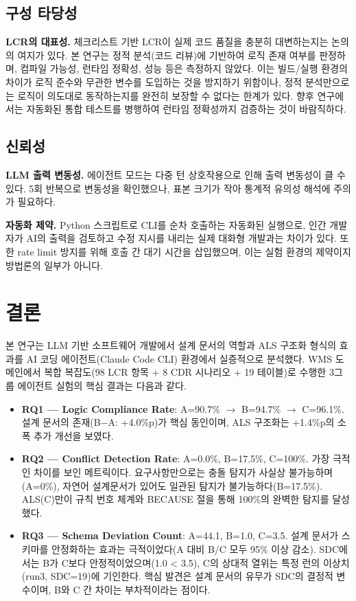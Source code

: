 \documentclass[conference]{IEEEtran}
\begin{document}
\subsection{구성 타당성}

\textbf{LCR의 대표성.} 체크리스트 기반 LCR이 실제 코드 품질을 충분히 대변하는지는 논의의 여지가 있다. 본 연구는 정적 분석(코드 리뷰)에 기반하여 로직 존재 여부를 판정하며, 컴파일 가능성, 런타임 정확성, 성능 등은 측정하지 않았다. 이는 빌드/실행 환경의 차이가 로직 준수와 무관한 변수를 도입하는 것을 방지하기 위함이나, 정적 분석만으로는 로직이 의도대로 동작하는지를 완전히 보장할 수 없다는 한계가 있다. 향후 연구에서는 자동화된 통합 테스트를 병행하여 런타임 정확성까지 검증하는 것이 바람직하다.

\subsection{신뢰성}

\textbf{LLM 출력 변동성.} 에이전트 모드는 다중 턴 상호작용으로 인해 출력 변동성이 클 수 있다. 5회 반복으로 변동성을 확인했으나, 표본 크기가 작아 통계적 유의성 해석에 주의가 필요하다.

\textbf{자동화 제약.} Python 스크립트로 CLI를 순차 호출하는 자동화된 실행으로, 인간 개발자가 AI의 출력을 검토하고 수정 지시를 내리는 실제 대화형 개발과는 차이가 있다. 또한 rate limit 방지를 위해 호출 간 대기 시간을 삽입했으며, 이는 실험 환경의 제약이지 방법론의 일부가 아니다.

\section{결론}

본 연구는 LLM 기반 소프트웨어 개발에서 설계 문서의 역할과 ALS 구조화 형식의 효과를 AI 코딩 에이전트(Claude Code CLI) 환경에서 실증적으로 분석했다. WMS 도메인에서 복합 복잡도(98 LCR 항목 + 8 CDR 시나리오 + 19 테이블)로 수행한 3그룹 에이전트 실험의 핵심 결과는 다음과 같다.

\begin{itemize}
  \item \textbf{RQ1 --- Logic Compliance Rate}: A=90.7\% $\rightarrow$ B=94.7\% $\rightarrow$ C=96.1\%. 설계 문서의 존재(B$-$A: +4.0\%p)가 핵심 동인이며, ALS 구조화는 +1.4\%p의 소폭 추가 개선을 보였다.
  \item \textbf{RQ2 --- Conflict Detection Rate}: A=0.0\%, B=17.5\%, C=100\%. 가장 극적인 차이를 보인 메트릭이다. 요구사항만으로는 충돌 탐지가 사실상 불가능하며(A=0\%), 자연어 설계문서가 있어도 일관된 탐지가 불가능하다(B=17.5\%). ALS(C)만이 규칙 번호 체계와 BECAUSE 절을 통해 100\%의 완벽한 탐지를 달성했다.
  \item \textbf{RQ3 --- Schema Deviation Count}: A=44.1, B=1.0, C=3.5. 설계 문서가 스키마를 안정화하는 효과는 극적이었다(A 대비 B/C 모두 95\% 이상 감소). SDC에서는 B가 C보다 안정적이었으며(1.0 < 3.5), C의 상대적 열위는 특정 런의 이상치(run3, SDC=19)에 기인한다. 핵심 발견은 설계 문서의 유무가 SDC의 결정적 변수이며, B와 C 간 차이는 부차적이라는 점이다.
\end{itemize}
\end{document}
